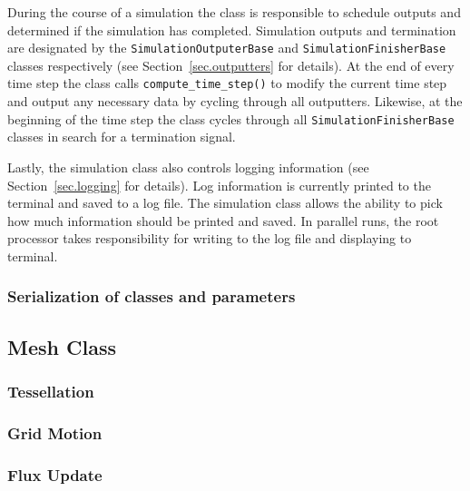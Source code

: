 During the course of a simulation the class is responsible to schedule outputs and
determined if the simulation has completed. Simulation outputs and termination are 
designated by the \lstinline{SimulationOutputerBase} and \lstinline{SimulationFinisherBase} 
classes respectively (see Section~\ref{sec.outputters} for details). At the end of every time
step the class calls \lstinline{compute_time_step()} to modify the current time step and
output any necessary data by cycling through all outputters. Likewise, at the beginning of
the time step the class cycles through all \lstinline{SimulationFinisherBase} classes 
in search for a termination signal.

Lastly, the simulation class also controls logging information (see Section~\ref{sec.logging}
for details). 
Log information is currently printed to the terminal and saved to a log file. The simulation class 
allows the ability to pick how much information should be printed and saved. In parallel runs, the 
root processor takes responsibility for writing to the log file and displaying to terminal.

\subsubsection{Serialization of classes and parameters}

\subsection{Mesh Class}
\subsubsection{Tessellation}
\subsubsection{Grid Motion}
\subsubsection{Flux Update}

